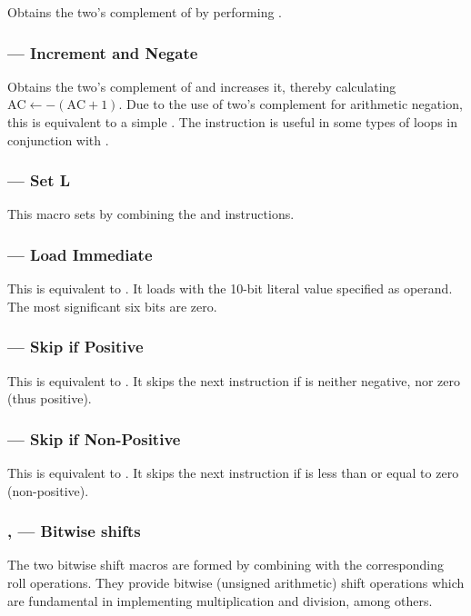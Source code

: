 Obtains the two's complement of \A{} by performing .

\subsubsection{ — Increment and Negate \A}

Obtains the two's complement of \A{} and increases it, thereby
calculating $\mbox{AC} \leftarrow -(\mbox{AC} + 1)$. Due to the use of
two's complement for arithmetic negation, this is equivalent to a
simple . The  instruction is useful in some
types of loops in conjunction with .

\subsubsection{ — Set L}

This macro sets \Lreg{} by combining the  and  instructions.

\subsubsection{ — Load Immediate}

This is equivalent to . It loads \A{} with the 10-bit literal
value specified as operand. The most significant six bits are zero.

\subsubsection{ — Skip if Positive \A}

This is equivalent to . It skips the next instruction
if \A{} is neither negative, nor zero (thus positive).

\subsubsection{ — Skip if Non-Positive \A}

This is equivalent to . It skips the next instruction
if \A{} is less than or equal to zero (non-positive).

\subsubsection{,  — Bitwise shifts}

The two bitwise shift macros are formed by combining  with
the corresponding  roll operations. They provide bitwise
(unsigned arithmetic) shift operations which are fundamental in
implementing multiplication and division, among others.

